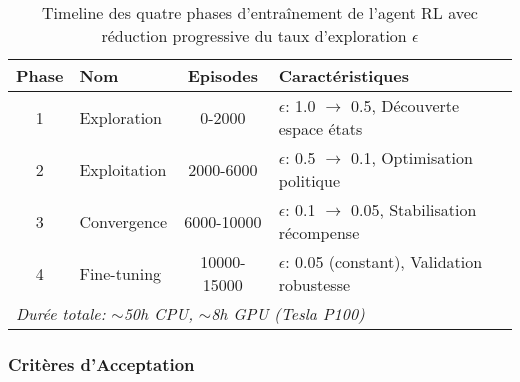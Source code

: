 \begin{table}[htbp]
    \centering
    \caption{Timeline des quatre phases d'entraînement de l'agent RL avec réduction progressive du taux d'exploration $\epsilon$}
    \label{tab:training-timeline}
    \begin{tabular}{|c|l|c|l|}
        \hline
        \textbf{Phase} & \textbf{Nom} & \textbf{Episodes} & \textbf{Caractéristiques}                            \\
        \hline
        1              & Exploration  & 0-2000            & $\epsilon$: 1.0 $\to$ 0.5, Découverte espace états   \\
        2              & Exploitation & 2000-6000         & $\epsilon$: 0.5 $\to$ 0.1, Optimisation politique    \\
        3              & Convergence  & 6000-10000        & $\epsilon$: 0.1 $\to$ 0.05, Stabilisation récompense \\
        4              & Fine-tuning  & 10000-15000       & $\epsilon$: 0.05 (constant), Validation robustesse   \\
        \hline
        \multicolumn{4}{|l|}{\textit{Durée totale: $\sim$50h CPU, $\sim$8h GPU (Tesla P100)}}                    \\
        \hline
    \end{tabular}
\end{table}

\subsubsection{Critères d'Acceptation}
\label{subsec:criteres_acceptation}


